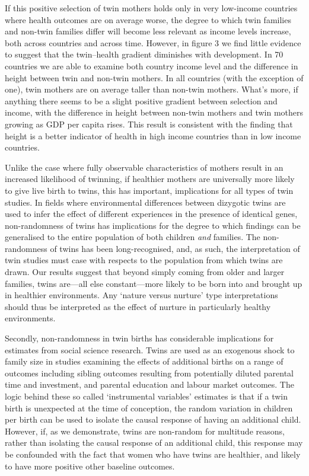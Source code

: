 \documentclass{nature}
\begin{document}
\begin{linenumbers}
If this positive selection of twin mothers holds only in very low-income countries where health outcomes are on average worse, the degree to which twin families and non-twin families differ will become less relevant as income levels increase, both across countries and across time.  However, in figure 3 we find little evidence to suggest that the twin--health gradient diminishes with development.  In 70 countries we are able to examine both country income level and the difference in height between twin and non-twin mothers.  In all countries (with the exception of one), twin mothers are on average taller than non-twin mothers.  What's more, if anything there seems to be a slight positive gradient between selection and income, with the difference in height between non-twin mothers and twin mothers growing as GDP per capita rises.  This result is consistent with the finding that height is a better indicator of health in high income countries than in low income countries\cite{Deaton2007}.

Unlike the case where fully observable characteristics of mothers result in an increased likelihood of twinning, if healthier mothers are universally more likely to give live birth to twins, this has important, implications for all types of twin studies.  In fields where environmental differences between dizygotic twins are used to infer the effect of different experiences in the presence of identical genes, non-randomness of twins has implications for the degree to which findings can be generalised to the entire population of both children \emph{and} families.  The non-randomness of twins has been long-recognised\cite{Recordetal1970}, and, as such, the interpretation of twin studies must case with respects to the population from which twins are drawn.  Our results suggest that beyond simply coming from older and larger families, twins are---all else constant---more likely to be born into and brought up in healthier environments.  Any `nature versus nurture' type interpretations should thus be interpreted as the effect of nurture in particularly healthy environments.

Secondly, non-randomness in twin births has considerable implications for estimates from social science research.  Twins are used as an exogenous shock to family size in studies examining the effects of additional births on a range of outcomes including sibling outcomes resulting from potentially diluted parental time and investment, and parental education and labour market outcomes.  The logic behind these so called `instrumental variables' estimates is that if a twin birth is unexpected at the time of conception, the random variation in children per birth can be used to isolate the causal response of having an additional child.  However, if, as we demonstrate, twins are non-random for multitude reasons, rather than isolating the causal response of an additional child, this response may be confounded with the fact that women who have twins are healthier, and likely to have more positive other baseline outcomes.


\end{linenumbers}
\end{document}
